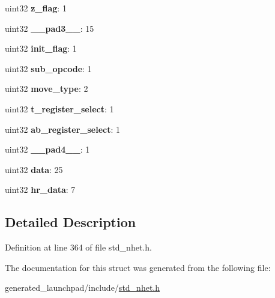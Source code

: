 \begin{DoxyCompactItemize}
uint32 {\bfseries z\+\_\+flag}\+: 1
\item 
\mbox{\label{structMOV32__format_a1cd840ca25b036b41030a1ea2c9777bf}} 
uint32 {\bfseries \+\_\+\+\_\+pad3\+\_\+\+\_\+}\+: 15
\item 
\mbox{\label{structMOV32__format_ad3cd4603520ca6038e3012195a1d2ead}} 
uint32 {\bfseries init\+\_\+flag}\+: 1
\item 
\mbox{\label{structMOV32__format_a9be38e8fbd18e906968e7172533efe08}} 
uint32 {\bfseries sub\+\_\+opcode}\+: 1
\item 
\mbox{\label{structMOV32__format_a4a102537775fe95e5553f2adfef985a6}} 
uint32 {\bfseries move\+\_\+type}\+: 2
\item 
\mbox{\label{structMOV32__format_a3a514ecf34d6817f0422900a469aeb00}} 
uint32 {\bfseries t\+\_\+register\+\_\+select}\+: 1
\item 
\mbox{\label{structMOV32__format_a34de467f31312bc1717022b8dd962619}} 
uint32 {\bfseries ab\+\_\+register\+\_\+select}\+: 1
\item 
\mbox{\label{structMOV32__format_af2acfaf500eaae4c6dbdc16aa9faf716}} 
uint32 {\bfseries \+\_\+\+\_\+pad4\+\_\+\+\_\+}\+: 1
\item 
\mbox{\label{structMOV32__format_ab1429323e05eb5de9041ec57df35f85d}} 
uint32 {\bfseries data}\+: 25
\item 
\mbox{\label{structMOV32__format_abd2b359548be92521f0f6f937edeb9b7}} 
uint32 {\bfseries hr\+\_\+data}\+: 7
\end{DoxyCompactItemize}


\subsection{Detailed Description}


Definition at line 364 of file std\+\_\+nhet.\+h.



The documentation for this struct was generated from the following file\+:\begin{DoxyCompactItemize}
\item 
generated\+\_\+launchpad/include/\mbox{\hyperlink{std__nhet_8h}{std\+\_\+nhet.\+h}}\end{DoxyCompactItemize}
